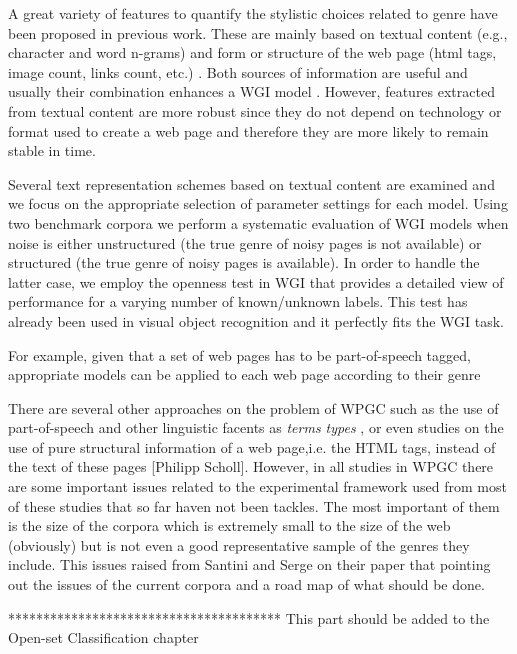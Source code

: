 A great variety of features to quantify the stylistic choices related to genre have been proposed in previous work. These are mainly based on textual content (e.g., character and word  n-grams) \parencite{mason2009distance,Sharroff2010} and form or structure of the web page (html tags, image count, links count, etc.) \parencite{Lim2005,levering2008using}. Both sources of  information are useful and usually their combination enhances a WGI model \parencite{kanaris2009learning}. However, features extracted from textual content are more robust since they do not  depend on technology or format used to create a web page and therefore they are more likely to remain stable in time.

 Several text  representation schemes based on textual content are examined and we focus on the appropriate selection of parameter settings for each model. Using two benchmark corpora we perform a  systematic evaluation of WGI models when noise is either unstructured (the true genre of noisy pages is not available) or structured (the true genre of noisy pages is available). In order  to handle the latter case, we employ the openness test in WGI that provides a detailed view of performance for a varying number of known/unknown labels. This test has already been used in  visual object recognition \parencite{scheirer2013toward} and it perfectly fits the WGI task.

 For example, given that a set of web pages has to be part-of-speech tagged, appropriate models can be applied to each web page according to their genre \parencite{Nooralahzadeh2014}

There are several other approaches on the problem of WPGC such as the use of part-of-speech and other linguistic facents as \textit{terms types} \parencite{feldman2009classifying,santini2005linguistic}, or even studies on the use of pure structural information of a web page,i.e. the HTML tags, instead of the text of these pages {[}Philipp Scholl{]}. However, in all studies in WPGC there are some important issues related to the experimental framework used from most of these studies that so far haven not been tackles. The most important of them is the size of the corpora which is extremely small to the size of the web (obviously) but is not even a good representative sample of the genres they include. This issues raised from Santini and Serge \parencite{santini2009web} on their paper that pointing out the issues of the current corpora and a road map of what should be done. 


***************************************
This part should be added to the Open-set Classification chapter

